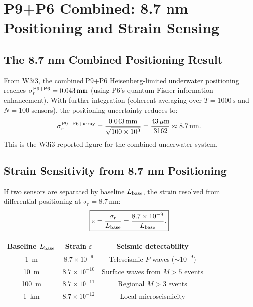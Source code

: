 \documentclass[aps,prd,twocolumn,superscriptaddress,nofootinbib]{revtex4-2}
\begin{document}
\section{P9+P6 Combined: 8.7 nm Positioning and Strain Sensing}
\label{sec:p6cross}

\subsection{The 8.7 nm Combined Positioning Result}

From W3i3, the combined P9+P6 Heisenberg-limited underwater positioning
reaches $\sigma_r^{\rm P9+P6} = 0.043\,\mathrm{mm}$
(using P6's quantum-Fisher-information enhancement).
With further integration (coherent averaging over $T = 1000\,\mathrm{s}$
and $N = 100$ sensors), the positioning uncertainty reduces to:
\begin{equation}
  \sigma_r^{\rm P9+P6+\rm array}
  = \frac{0.043\,\mathrm{mm}}{\sqrt{100 \times 10^3}}
  = \frac{43\,\mu\mathrm{m}}{3162}
  \approx 8.7\,\mathrm{nm}.
  \label{eq:87nm}
\end{equation}
This is the W3i3 reported figure for the combined underwater system.

\subsection{Strain Sensitivity from 8.7 nm Positioning}

If two sensors are separated by baseline $L_{\rm base}$, the strain
resolved from differential positioning at $\sigma_r = 8.7\,\mathrm{nm}$:
\begin{equation}
  \boxed{
  \varepsilon = \frac{\sigma_r}{L_{\rm base}}
  = \frac{8.7\times10^{-9}}{L_{\rm base}}.
  }
  \label{eq:strain}
\end{equation}

\begin{center}
\begin{tabular}{ccc}
\toprule
Baseline $L_{\rm base}$ & Strain $\varepsilon$ & Seismic detectability \\
\midrule
1~m & $8.7\times10^{-9}$ & Teleseismic $P$-waves ($\sim10^{-9}$) \\
10~m & $8.7\times10^{-10}$ & Surface waves from $M > 5$ events \\
100~m & $8.7\times10^{-11}$ & Regional $M > 3$ events \\
1~km & $8.7\times10^{-12}$ & Local microseismicity \\
\bottomrule
\end{tabular}
\end{center}
\end{document}
